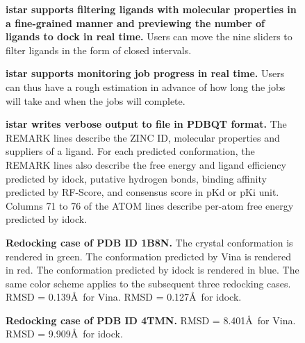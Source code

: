 \documentclass[10pt]{article}
\begin{document}
\begin{figure}[!ht]
\begin{center}
\end{center}
\caption{
{\bf istar supports filtering ligands with molecular properties in a fine-grained manner and previewing the number of ligands to dock in real time.} Users can move the nine sliders to filter ligands in the form of closed intervals.
}
\label{Slider}
\end{figure}

\begin{figure}[!ht]
\begin{center}
\end{center}
\caption{
{\bf istar supports monitoring job progress in real time.} Users can thus have a rough estimation in advance of how long the jobs will take and when the jobs will complete.
}
\label{Progress}
\end{figure}

\begin{figure}[!ht]
\begin{center}
\end{center}
\caption{
{\bf istar writes verbose output to file in PDBQT format.} The REMARK lines describe the ZINC ID, molecular properties and suppliers of a ligand. For each predicted conformation, the REMARK lines also describe the free energy and ligand efficiency predicted by idock, putative hydrogen bonds, binding affinity predicted by RF-Score, and consensus score in pKd or pKi unit. Columns 71 to 76 of the ATOM lines describe per-atom free energy predicted by idock.
}
\label{OutputPDBQT}
\end{figure}

\begin{figure}[!ht]
\begin{center}
\end{center}
\caption{
{\bf Redocking case of PDB ID 1B8N.} The crystal conformation is rendered in green. The conformation predicted by Vina is rendered in red. The conformation predicted by idock is rendered in blue. The same color scheme applies to the subsequent three redocking cases. RMSD = 0.139\AA\ for Vina. RMSD = 0.127\AA\ for idock.
}
\label{Redocking1B8N}
\end{figure}

\begin{figure}[!ht]
\begin{center}
\end{center}
\caption{
{\bf Redocking case of PDB ID 4TMN.} RMSD = 8.401\AA\ for Vina. RMSD = 9.909\AA\ for idock.
}
\label{Redocking4TMN}
\end{figure}
\end{document}
